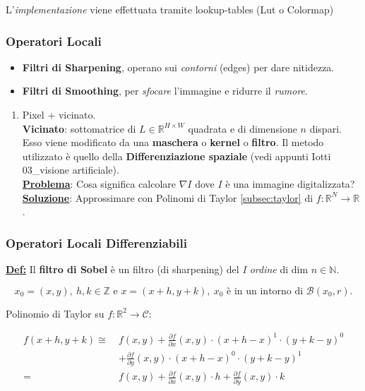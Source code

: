 \documentclass[a4paper,12pt]{article}
\newcommand{\definizione}{\noindent\textbf{\underline{Def:}} }
\begin{document}
	L'\textit{implementazione} viene effettuata tramite lookup-tables (Lut o Colormap)

	\subsubsection{Operatori Locali}

	\begin{itemize}
		\item \textbf{Filtri di Sharpening}, operano sui \textit{contorni} (edges) per dare nitidezza.
		\item \textbf{Filtri di Smoothing}, per \textit{sfocare} l'immagine e ridurre il \textit{rumore}.
	\end{itemize}

	\begin{enumerate}
		\item Pixel + vicinato. \\
		\textbf{Vicinato}: sottomatrice di $L \in \mathbb{R}^{H \times W}$ quadrata e di dimensione $n$ dispari. Esso viene modificato da una \textbf{maschera} o \textbf{kernel} o \textbf{filtro}. Il metodo utilizzato è quello della \textbf{Differenziazione spaziale} (vedi appunti Iotti 03\_visione artificiale). \\

		\textbf{\underline{Problema}}: Cosa significa calcolare $\nabla I$ dove $I$ è una immagine digitalizzata? \\
		\textbf{\underline{Soluzione}}: Approssimare con Polinomi di Taylor \ref{subsec:taylor} di $f: \mathbb{R}^N \rightarrow \mathbb{R}$.
	\end{enumerate}

	\subsubsection{Operatori Locali Differenziabili}

	\definizione Il \textbf{filtro di Sobel} è un filtro (di sharpening) del \textit{I ordine} di dim $n \in \mathbb{N}$.

	\[
	x_0 =(x,y), \ h,k \in \mathbb{Z} \text{ e } x = (x + h, y + k), \ x_0 \text{ è in un intorno di } \mathcal{B}(x_0,r).
	\]

	Polinomio di Taylor su $f : \mathbb{R}^2 \rightarrow \mathcal{C}$:

	\begin{align*}
		f(x + h, y + k) \cong\
		& f(x, y)
		+ \frac{\partial f}{\partial x}(x, y) \cdot (x + h - x)^1 \cdot (y + k - y)^0 \\
		& + \frac{\partial f}{\partial y}(x, y) \cdot (x + h - x)^0 \cdot (y + k - y)^1 \\
		=\
		& f(x, y)
		+ \frac{\partial f}{\partial x}(x, y) \cdot h
		+ \frac{\partial f}{\partial y}(x, y) \cdot k
	\end{align*}
\end{document}
